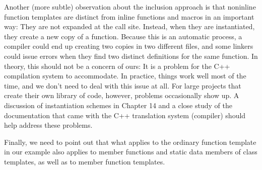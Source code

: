 Another (more subtle) observation about the inclusion approach is that noninline function templates are distinct from inline functions and macros in an important way: They are not expanded at the call site. Instead, when they are instantiated, they create a new copy of a function. Because this is an automatic process, a compiler could end up creating two copies in two different files, and some linkers could issue errors when they find two distinct definitions for the same function. In theory, this should not be a concern of ours: It is a problem for the C++ compilation system to accommodate. In practice, things work well most of the time, and we don’t need to deal with this issue at all. For large projects that create their own library of code, however, problems occasionally show up. A discussion of instantiation schemes in Chapter 14 and a close study of the documentation that came with the C++ translation system (compiler) should help address these problems.

Finally, we need to point out that what applies to the ordinary function template in our example also applies to member functions and static data members of class templates, as well as to member function templates.












